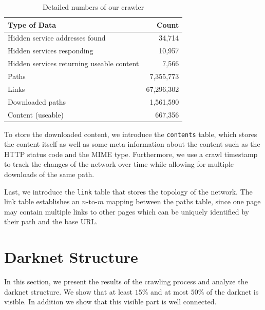 \ifdgruyter
  \begin{table}[H]
      \begin{center}
          \caption{Detailed numbers of our crawler}
          \label{table:scrapMetrics}
          \begin{tabular}[l]{l|r}
          \textbf{Type of Data}           & \textbf{Count} \\
          \hline
          \hline
          Hidden service addresses found      & 34,714                                    \\
          \hline
          Hidden services responding                & 10,957                      \\
          \hline
          Hidden services returning useable content & 7,566                      \\
          \hline
          Paths                           & 7,355,773                   \\
          \hline
          Links                           & 67,296,302                \\
          \hline
          Downloaded paths                & 1,561,590                 \\
          \hline
          Content (useable)               & 667,356         \\
          \end{tabular}
      \end{center}
  \end{table}
\fi


To store the downloaded content, we introduce the \texttt{contents} table, which stores the content itself as well as some meta information about the content such as the HTTP status code and the MIME type. Furthermore, we use a crawl timestamp to track the changes of the network over time while allowing for multiple downloads of the same path.

Last, we introduce the \texttt{link} table that stores the topology of the network. The link table establishes an $n$-to-$m$ mapping between the paths table, since one page may contain multiple links to other pages which can be uniquely identified by their path and the base URL.
%
%
\section{Darknet Structure}
\label{sec:data}
In this section, we present the results of the crawling process and analyze the darknet structure. We show that at least $15\%$ and at most $50\%$ of the darknet is visible. In addition we show that this visible part is well connected. 

